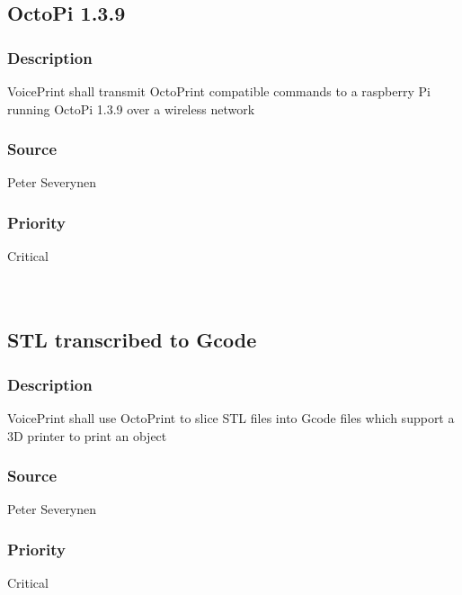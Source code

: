 \subsection{OctoPi 1.3.9}
\subsubsection{Description}
VoicePrint shall transmit OctoPrint compatible commands to a raspberry Pi running OctoPi 1.3.9 over a wireless network
\subsubsection{Source}
Peter Severynen
\subsubsection{Priority}
Critical\\
\\
\\
\subsection{STL transcribed to Gcode}
\subsubsection{Description}
VoicePrint shall use OctoPrint to slice STL files into Gcode files which support a 3D printer to print an object \cite{OctoPrint}
\subsubsection{Source}
Peter Severynen
\subsubsection{Priority}
Critical